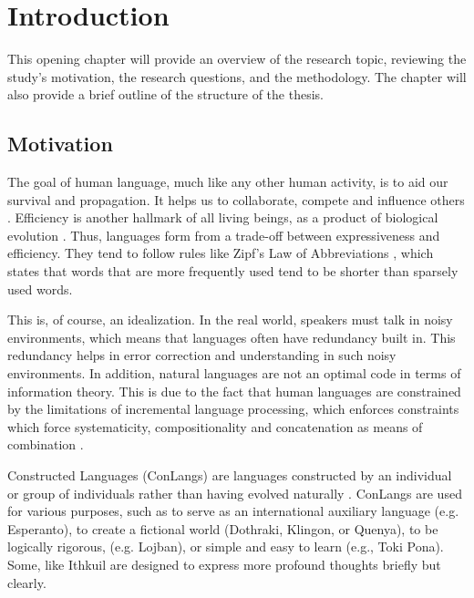 
\chapter{Introduction}\label{chapter:introduction}

This opening chapter will provide an overview of the research topic, reviewing the study's motivation, the research questions, and the 
methodology. The chapter will also provide a brief outline of the structure of the thesis.

\section{Motivation}

The goal of human language, much like any other human activity, is to aid our survival and propagation. It helps us to collaborate, compete and 
influence others \cite{Levshina_2022}. Efficiency is another hallmark of all living beings, as a product of biological evolution \cite{haCostBenefit2010}. 
Thus, languages form from a trade-off between expressiveness and efficiency. They tend to follow rules like Zipf's Law of Abbreviations \cite{piantadosiZipfsWordFrequency2014}, 
which states that words that are more frequently used tend to be shorter than sparsely used words. 

This is, of course, an idealization. In the real world, speakers must talk in noisy environments, which means that languages often have redundancy
built in. This redundancy helps in error correction and understanding in such noisy environments. In addition, natural languages are not an
optimal code in terms of information theory. This is due to the fact that human languages are constrained by the limitations of incremental
language processing, which enforces constraints which force systematicity, compositionality and concatenation as means of 
combination \cite{futrellInformationTheoryBridge2022}.

Constructed Languages (ConLangs) are languages constructed by an individual or group of individuals rather than having evolved 
naturally \cite{schreyerConstructedLanguages2021}. ConLangs are used for various purposes, such as to serve as an international auxiliary 
language (e.g. Esperanto), to create a fictional world (Dothraki, Klingon, or Quenya), to be logically rigorous, (e.g. Lojban), or simple 
and easy to learn (e.g., Toki Pona). Some, like Ithkuil \cite{Ithkuil2024} are designed to express more profound thoughts briefly but clearly. 

